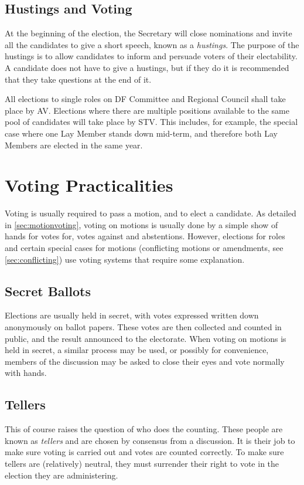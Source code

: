 \documentclass[a4paper, 12pt]{article} %
\begin{document}
\subsection{Hustings and Voting}
At the beginning of the election, the Secretary will close nominations and invite all the candidates to give a short speech, known as a \emph{hustings}.  The purpose of the hustings is to allow candidates to inform and persuade voters of their electability.  A candidate does not have to give a hustings, but if they do it is recommended that they take questions at the end of it.

All elections to single roles on DF Committee and Regional Council shall take place by AV.  Elections where there are multiple positions available to the same pool of candidates will take place by STV.  This includes, for example, the special case where one Lay Member stands down mid-term, and therefore both Lay Members are elected in the same year.

\section{Voting Practicalities}
Voting is usually required to pass a motion, and to elect a candidate.  As detailed in \autoref{sec:motionvoting}, voting on motions is usually done by a simple show of hands for votes for, votes against and abstentions.  However, elections for roles and certain special cases for motions (conflicting motions or amendments, see \autoref{sec:conflicting}) use voting systems that require some explanation.

\subsection{Secret Ballots}
Elections are usually held in secret, with votes expressed written down anonymously on ballot papers.  These votes are then collected and counted in public, and the result announced to the electorate.  When voting on motions is held in secret, a similar process may be used, or possibly for convenience, members of the discussion may be asked to close their eyes and vote normally with hands.

\subsection{Tellers}
This of course raises the question of who does the counting.  These people are known as \emph{tellers} and are chosen by consensus from a discussion.  It is their job to make sure voting is carried out and votes are counted correctly.  To make sure tellers are (relatively) neutral, they must surrender their right to vote in the election they are administering.
\end{document}

